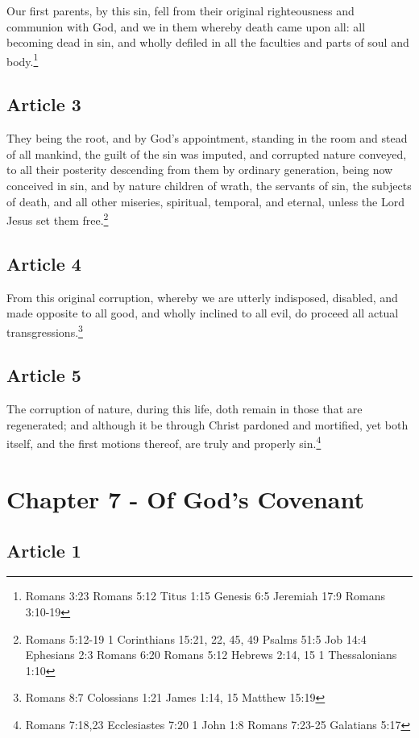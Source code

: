 \documentclass[12pt,letterpaper]{book}
\begin{document}
Our first parents, by this sin, fell from their original righteousness and communion with God, and we in them whereby death came upon all: all becoming dead in sin, and wholly defiled in all the faculties and parts of soul and body.\footnote{Romans 3:23 Romans 5:12 Titus 1:15 Genesis 6:5 Jeremiah 17:9 Romans 3:10-19}

\section{Article 3}

They being the root, and by God's appointment, standing in the room and stead of all mankind, the guilt of the sin was imputed, and corrupted nature conveyed, to all their posterity descending from them by ordinary generation, being now conceived in sin, and by nature children of wrath, the servants of sin, the subjects of death, and all other miseries, spiritual, temporal, and eternal, unless the Lord Jesus set them free.\footnote{Romans 5:12-19 1 Corinthians 15:21, 22, 45, 49 Psalms 51:5 Job 14:4 Ephesians 2:3 Romans 6:20 Romans 5:12 Hebrews 2:14, 15 1 Thessalonians 1:10}

\section{Article 4}

From this original corruption, whereby we are utterly indisposed, disabled, and made opposite to all good, and wholly inclined to all evil, do proceed all actual transgressions.\footnote{Romans 8:7 Colossians 1:21 James 1:14, 15 Matthew 15:19}

\section{Article 5}

The corruption of nature, during this life, doth remain in those that are regenerated; and although it be through Christ pardoned and mortified, yet both itself, and the first motions thereof, are truly and properly sin.\footnote{Romans 7:18,23 Ecclesiastes 7:20 1 John 1:8 Romans 7:23-25 Galatians 5:17}

\chapter{Chapter 7 - Of God's Covenant}
\section{Article 1}
\end{document}

